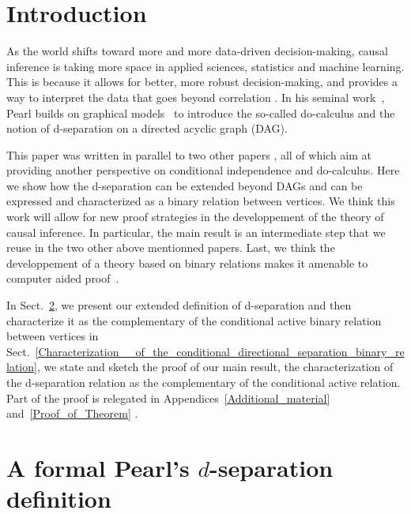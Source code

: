 \documentclass[12pt]{article}
\def\citep#1{\cite{#1}}
\newif\ifpreprint
\begin{document}
\section{Introduction}
As the world shifts toward more and more data-driven decision-making, causal
inference is taking more space in applied sciences, statistics and machine
learning.  This is because it allows for better, more robust decision-making,
and provides a way to interpret the data that goes beyond correlation
\citep{pearl2018book}.  In his seminal work~\citep{pearl1995causal}, Pearl
builds on graphical models~\citep{cowell2006probabilistic} to introduce the
so-called do-calculus and the notion of d-separation on a directed acyclic graph
(DAG).

This paper was written in parallel to two other papers
\citep{De-Lara-Chancelier-Heymann-2021,Heymann-De-Lara-Chancelier-2021}, all of
which aim at providing another perspective on conditional independence and
do-calculus.  Here we show how the d-separation can be extended beyond DAGs and
can be expressed and characterized as a binary relation between vertices.  We
think this work will allow for new proof strategies in the developpement of the
theory of causal inference.  In particular, the main result is an intermediate
step that we reuse in the two other above mentionned papers.  Last, we think the
developpement of a theory based on binary relations makes it amenable to
computer aided proof~\citep{pous2013}. %

In Sect.~\ref{Conditional_active_relation_induced_by_endpoints_of_non-blocking_paths},
we present our extended definition of d-separation and then characterize it as
the complementary of the conditional active binary relation between vertices in
Sect.~\ref{Characterization__of_the_conditional_directional_separation_binary_relation},
we state and sketch the proof of our main result, the characterization of the
d-separation relation as the complementary of the conditional active relation.
Part of the proof is relegated in Appendices~\ref{Additional_material}
and~\ref{Proof_of_Theorem}%
\ifpreprint , as well as a treatment of the moral
  relation~\citep{Lauritzen-et-al-1990} with binary relations in
  Appendices~\ref{Moral_relation}.  \else .  \fi

\section{A formal Pearl's $d$-separation definition}
\label{Conditional_active_relation_induced_by_endpoints_of_non-blocking_paths}
\end{document}
